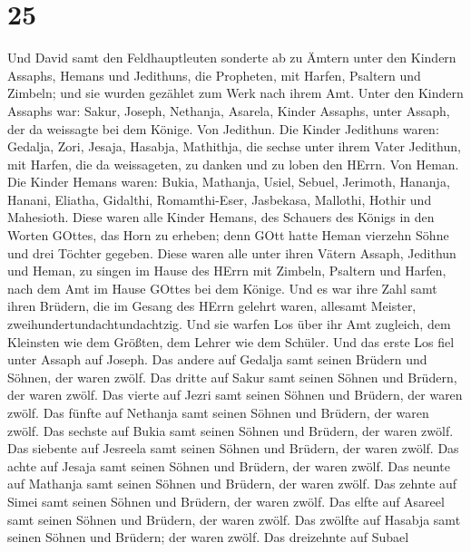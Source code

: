 \hypertarget{section-24}{%
\section{25}\label{section-24}}

 Und David samt den Feldhauptleuten sonderte ab zu Ämtern
unter den Kindern Assaphs, Hemans und Jedithuns, die Propheten, mit
Harfen, Psaltern und Zimbeln; und sie wurden gezählet zum Werk nach
ihrem Amt.  Unter den Kindern Assaphs war: Sakur, Joseph,
Nethanja, Asarela, Kinder Assaphs, unter Assaph, der da weissagte bei
dem Könige.  Von Jedithun. Die Kinder Jedithuns waren:
Gedalja, Zori, Jesaja, Hasabja, Mathithja, die sechse unter ihrem Vater
Jedithun, mit Harfen, die da weissageten, zu danken und zu loben den
HErrn.  Von Heman. Die Kinder Hemans waren: Bukia, Mathanja,
Usiel, Sebuel, Jerimoth, Hananja, Hanani, Eliatha, Gidalthi,
Romamthi-Eser, Jasbekasa, Mallothi, Hothir und Mahesioth. 
Diese waren alle Kinder Hemans, des Schauers des Königs in den Worten
GOttes, das Horn zu erheben; denn GOtt hatte Heman vierzehn Söhne und
drei Töchter gegeben.  Diese waren alle unter ihren Vätern
Assaph, Jedithun und Heman, zu singen im Hause des HErrn mit Zimbeln,
Psaltern und Harfen, nach dem Amt im Hause GOttes bei dem Könige.
 Und es war ihre Zahl samt ihren Brüdern, die im Gesang des
HErrn gelehrt waren, allesamt Meister, zweihundertundachtundachtzig.
 Und sie warfen Los über ihr Amt zugleich, dem Kleinsten wie
dem Größten, dem Lehrer wie dem Schüler.  Und das erste Los
fiel unter Assaph auf Joseph. Das andere auf Gedalja samt seinen Brüdern
und Söhnen, der waren zwölf.  Das dritte auf Sakur samt
seinen Söhnen und Brüdern, der waren zwölf.  Das vierte auf
Jezri samt seinen Söhnen und Brüdern, der waren zwölf.  Das
fünfte auf Nethanja samt seinen Söhnen und Brüdern, der waren zwölf.
 Das sechste auf Bukia samt seinen Söhnen und Brüdern, der
waren zwölf.  Das siebente auf Jesreela samt seinen Söhnen
und Brüdern, der waren zwölf.  Das achte auf Jesaja samt
seinen Söhnen und Brüdern, der waren zwölf.  Das neunte auf
Mathanja samt seinen Söhnen und Brüdern, der waren zwölf. 
Das zehnte auf Simei samt seinen Söhnen und Brüdern, der waren zwölf.
 Das elfte auf Asareel samt seinen Söhnen und Brüdern, der
waren zwölf.  Das zwölfte auf Hasabja samt seinen Söhnen
und Brüdern; der waren zwölf.  Das dreizehnte auf Subael
